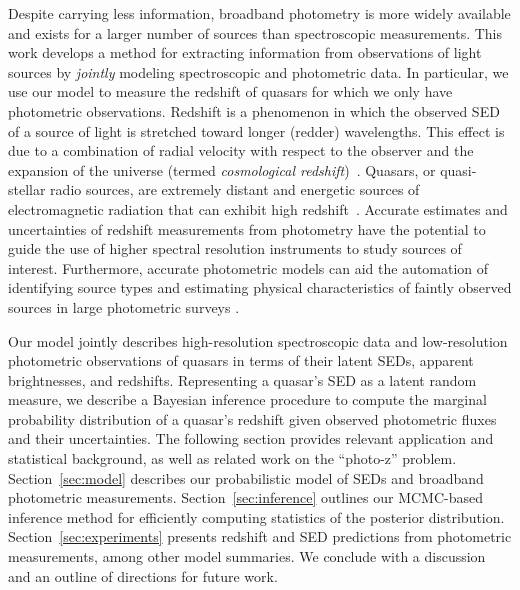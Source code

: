 \documentclass{article} %
\begin{document}
Despite carrying less information, broadband photometry is more widely available and exists for a larger number of sources than spectroscopic measurements. 
This work develops a method for extracting information from observations of light sources by \emph{jointly} modeling spectroscopic and photometric data.  
In particular, we use our model to measure the redshift of quasars for which we only have photometric observations.  
Redshift is a phenomenon in which the observed SED of a source of light is stretched toward longer (redder) wavelengths.
This effect is due to a combination of radial velocity with respect to the observer and the expansion of the universe (termed \emph{cosmological redshift})~\cite{hogg1999distance, harrison1993redshift}.  
Quasars, or quasi-stellar radio sources, are extremely distant and energetic sources of electromagnetic radiation that can exhibit high redshift~\cite{silk1997quasars}.  
Accurate estimates and uncertainties of redshift measurements from photometry have the potential to guide the use of higher spectral resolution instruments to study sources of interest.  
Furthermore, accurate photometric models can aid the automation of identifying source types and estimating physical characteristics of faintly observed sources in large photometric surveys \cite{regier2015}.  

Our model jointly describes high-resolution spectroscopic data and low-resolution photometric observations of quasars in terms of their latent SEDs, apparent brightnesses, and redshifts. 
Representing a quasar's SED as a latent random measure, we describe a Bayesian inference procedure to compute the marginal probability distribution of a quasar's redshift given observed photometric fluxes and their uncertainties.  
The following section provides relevant application and statistical background, as well as related work on the ``photo-z'' problem.
Section~\ref{sec:model} describes our probabilistic model of SEDs and broadband photometric measurements.
Section~\ref{sec:inference} outlines our MCMC-based inference method for efficiently computing statistics of the posterior distribution.
Section~\ref{sec:experiments} presents redshift and SED predictions from photometric measurements, among other model summaries.
We conclude with a discussion and an outline of directions for future work.  
\end{document}
